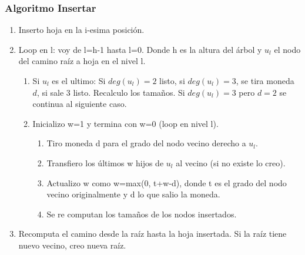 \documentclass[10pt]{beamer}
\begin{document}
\begin{frame}
\frametitle{Algoritmo Insertar}
 \begin{enumerate}\itemsep-1em
  \item Inserto hoja en la i-esima posición.
  \item Loop en l: voy de l=h-1 hasta l=0.
    Donde h es la altura del árbol y $u_l$ el nodo del camino raíz a hoja en el nivel l.
\pause
    \vspace{-0.4cm}
    \begin{enumerate}[a]\itemsep-1em
    \item Si $u_l$ es el ultimo: Si $deg(u_l)=2$ listo, si $deg(u_l)=3$, se tira moneda $d$, si sale 3 listo. Recalculo los tamaños.
      Si $deg(u_l)=3$ pero $d=2$ se continua al siguiente caso.
\pause
    \item Inicializo w=1 y termina con w=0 (loop en nivel l).
          \vspace{-0.4cm}
      \begin{enumerate}[i]\itemsep-1em
\pause
        \item Tiro moneda d para el grado del nodo vecino derecho a $u_l$.
        \item Transfiero los últimos w hijos de $u_l$ al vecino (si no existe lo creo).
\pause
        \item Actualizo w como w=max(0, t+w-d), donde t es el grado del nodo vecino originalmente y d lo que salio la moneda.
         \item Se re computan los tama\~nos de los nodos insertados.
      \end{enumerate}
  \end{enumerate}
\pause
  \item  Recomputa el camino desde la raíz hasta la hoja insertada.
  Si la raíz tiene nuevo vecino, creo nueva raíz.
\end{enumerate}

\end{frame}

\end{document}
